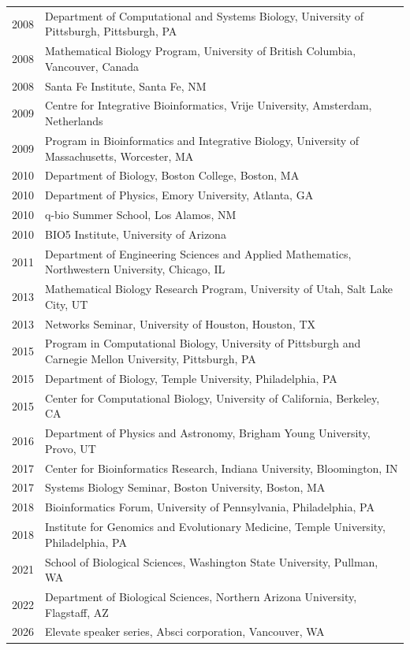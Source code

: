 \documentclass[11pt]{article}
\begin{document}
\begin{longtable}[l]{l l}
2008 & Department of Computational and Systems Biology, University of Pittsburgh, Pittsburgh, PA\\
2008 & Mathematical Biology Program, University of British Columbia, Vancouver, Canada \\
2008 & Santa Fe Institute, Santa Fe, NM\\
2009 & Centre for Integrative Bioinformatics, Vrije University, Amsterdam, Netherlands\\
2009 & Program in Bioinformatics and Integrative Biology, University of Massachusetts, Worcester, MA\\
2010 & Department of Biology, Boston College, Boston, MA\\
2010 & Department of Physics, Emory University, Atlanta, GA\\
2010 & q-bio Summer School, Los Alamos, NM\\
2010 & BIO5 Institute, University of Arizona\\
2011 & Department of Engineering Sciences and Applied Mathematics, Northwestern University, Chicago, IL\\
2013 & Mathematical Biology Research Program, University of Utah, Salt Lake City, UT\\
2013 & Networks Seminar, University of Houston, Houston, TX\\
2015 & Program in Computational Biology, University of Pittsburgh and Carnegie Mellon University, Pittsburgh, PA\\
2015 & Department of Biology, Temple University, Philadelphia, PA\\
2015 & Center for Computational Biology, University of California, Berkeley, CA\\
2016 & Department of Physics and Astronomy, Brigham Young University, Provo, UT\\
2017 & Center for Bioinformatics Research, Indiana University, Bloomington, IN\\
2017 & Systems Biology Seminar, Boston University, Boston, MA\\
2018 & Bioinformatics Forum, University of Pennsylvania, Philadelphia, PA\\
2018 & Institute for Genomics and Evolutionary Medicine, Temple University, Philadelphia, PA\\
2021 & School of Biological Sciences, Washington State University, Pullman, WA\\
2022 & Department of Biological Sciences, Northern Arizona University, Flagstaff, AZ\\
2026 & Elevate speaker series, Absci corporation, Vancouver, WA
\end{longtable}
\end{document}
